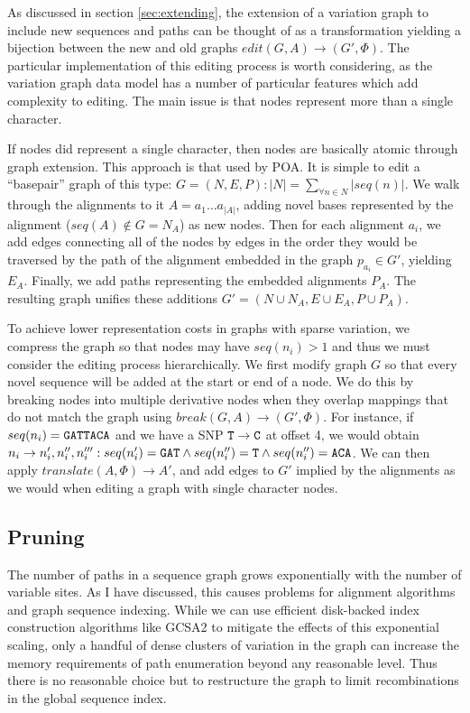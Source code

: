 As discussed in section \ref{sec:extending}, the extension of a variation graph to include new sequences and paths can be thought of as a transformation yielding a bijection between the new and old graphs $edit(G, A) \to (G', \Phi)$.
The particular implementation of this editing process is worth considering, as the variation graph data model has a number of particular features which add complexity to editing.
The main issue is that nodes represent more than a single character.

If nodes did represent a single character, then nodes are basically atomic through graph extension.
This approach is that used by POA.
It is simple to edit a ``basepair'' graph of this type: $G = (N, E, P) : |N| = \sum_{\forall n \in N} |seq(n)|$.
We walk through the alignments to it $A = a_1\ldots a_{|A|}$, adding novel bases represented by the alignment ($seq(A) \notin G = N_A$) as new nodes.
Then for each alignment $a_i$, we add edges connecting all of the nodes by edges in the order they would be traversed by the path of the alignment embedded in the graph $p_{a_i} \in G'$, yielding $E_A$.
Finally, we add paths representing the embedded alignments $P_A$.
The resulting graph unifies these additions $G' = (N \cup N_A, E \cup E_A, P \cup P_A)$.

To achieve lower representation costs in graphs with sparse variation, we compress the graph so that nodes may have $seq(n_i) > 1$ and thus we must consider the editing process hierarchically.
We first modify graph $G$ so that every novel sequence will be added at the start or end of a node.
We do this by breaking nodes into multiple derivative nodes when they overlap mappings that do not match the graph using $break(G, A) \to (G', \Phi)$.
For instance, if $seq(n_i) = {\tt GATTACA}$ and we have a SNP ${\tt T} \to {\tt C}$ at offset 4, we would obtain $n_i \to n_i', n_i'', n_i''' : seq(n_i') = {\tt GAT} \land seq(n_i'') = {\tt T} \land seq(n_i'') = {\tt ACA}$.
We can then apply $translate(A, \Phi) \to A'$, and add edges to $G'$ implied by the alignments as we would when editing a graph with single character nodes.

\subsection{Pruning}

The number of paths in a sequence graph grows exponentially with the number of variable sites.
As I have discussed, this causes problems for alignment algorithms and graph sequence indexing.
While we can use efficient disk-backed index construction algorithms like GCSA2 to mitigate the effects of this exponential scaling, only a handful of dense clusters of variation in the graph can increase the memory requirements of path enumeration beyond any reasonable level.
Thus there is no reasonable choice but to restructure the graph to limit recombinations in the global sequence index.

